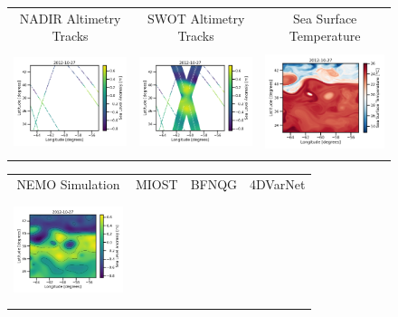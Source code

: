 \begin{figure}[t!]
\small
\begin{center}
\setlength{\tabcolsep}{1pt}
\begin{tabular}{ccc}
NADIR Altimetry Tracks & 
SWOT Altimetry Tracks &
Sea Surface Temperature \\
\includegraphics[width=42.5mm, height=30mm]{00_Oceanbench/content/figures/maps/sla/dc20a_ssh_anomaly_nadir4_20121027.png} 
&
\includegraphics[width=42.5mm, height=30mm]{00_Oceanbench/content/figures/maps/sla/dc20a_ssh_anomaly_swot1nadir5_20121027.png} &
\includegraphics[width=4.25cm,height=3cm]{00_Oceanbench/content/figures/maps/sst/dc20a_nemo_sst.png}
\end{tabular}
\begin{tabular}{cccc}
\hspace{3mm} NEMO Simulation & 
\hspace{3mm} MIOST & 
\hspace{3mm} BFNQG & 
4DVarNet \\
\vspace{-2mm}
\includegraphics[trim={0 0 42mm 0},clip, width=3.20cm,height=3cm]{00_Oceanbench/content/figures/maps/sla/dc20a_nemo_sla.png} &

\end{tabular}
\end{center}
\end{figure}
